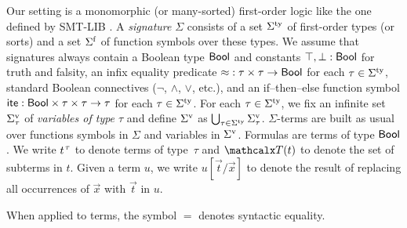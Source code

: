 Our setting is a monomorphic (or many-sorted) first-order logic
like the one defined by SMT-LIB \cite{smtlib25}.
A \emph{signature} $\Sigma$ consists of
a set $\stypes{\Sigma}$ of %
first-order types
%
(or sorts) and a set $\sfuns{\Sigma}$ of function symbols over these types.
We assume that signatures always contain a Boolean type $\mathsf{Bool}$ and constants
$\top, \bot : \mathsf{Bool}$ for truth and falsity,
an infix equality predicate ${\approx} : \tau \times \tau \to \mathsf{Bool}$
for each $\tau \in \stypes{\Sigma}$,
standard Boolean connectives ($\neg$, $\wedge$, $\vee$, etc.),
and an if--then--else function symbol
$\mathsf{ite} : \mathsf{Bool} \times \tau \times \tau \rightarrow \tau$
for each $\tau \in \stypes{\Sigma}$.
%
For each $\tau \in \stypes{\Sigma}$,
we fix an infinite set $\svars{\Sigma}_\tau$ of \emph{variables of type $\tau$} and
define $\svars{\Sigma}$ as $\bigcup_{\tau \in \stypes{\Sigma}} \svars{\Sigma}_\tau$.
$\Sigma$-terms are built as usual over functions symbols in $\Sigma$ and variables in $\svars{\Sigma}$.
%
Formulas are terms of type $\mathsf{Bool}$.
We write $t\typ{\tau}$ to denote %
terms of type~$\tau$ and $\terms( t )$ to denote the set of subterms in $t$.
Given a term $u$, we write $u[\vec t/\vec x]$ to denote the result of replacing
all occurrences of $\vec x$ with $\vec t$ in $u$.
\begin{rep}When applied to terms, the symbol $=$ denotes syntactic equality.\end{rep}


